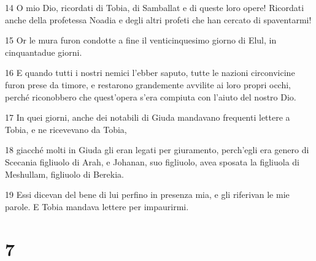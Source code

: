 \par 14 O mio Dio, ricordati di Tobia, di Samballat e di queste loro opere! Ricordati anche della profetessa Noadia e degli altri profeti che han cercato di spaventarmi!
\par 15 Or le mura furon condotte a fine il venticinquesimo giorno di Elul, in cinquantadue giorni.
\par 16 E quando tutti i nostri nemici l'ebber saputo, tutte le nazioni circonvicine furon prese da timore, e restarono grandemente avvilite ai loro propri occhi, perché riconobbero che quest'opera s'era compiuta con l'aiuto del nostro Dio.
\par 17 In quei giorni, anche dei notabili di Giuda mandavano frequenti lettere a Tobia, e ne ricevevano da Tobia,
\par 18 giacché molti in Giuda gli eran legati per giuramento, perch'egli era genero di Scecania figliuolo di Arah, e Johanan, suo figliuolo, avea sposata la figliuola di Meshullam, figliuolo di Berekia.
\par 19 Essi dicevan del bene di lui perfino in presenza mia, e gli riferivan le mie parole. E Tobia mandava lettere per impaurirmi.

\chapter{7}

